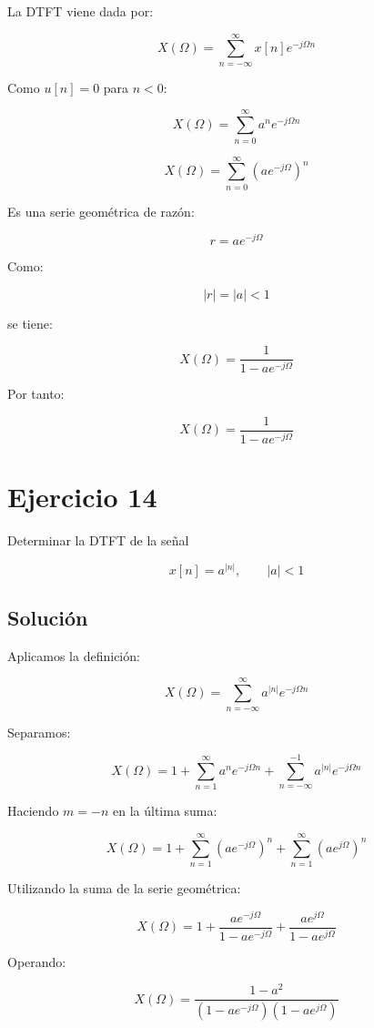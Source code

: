 \documentclass[fleqn]{article}
\begin{document}
	La DTFT viene dada por:

	\[
	X(\Omega)
	=
	\sum_{n=-\infty}^{\infty}
	x[n]e^{-j\Omega n}
	\]

	Como $u[n]=0$ para $n<0$:

	\[
	X(\Omega)
	=
	\sum_{n=0}^{\infty}
	a^ne^{-j\Omega n}
	\]

	\[
	X(\Omega)
	=
	\sum_{n=0}^{\infty}
	\left(
	ae^{-j\Omega}
	\right)^n
	\]

	Es una serie geométrica de razón:

	\[
	r=ae^{-j\Omega}
	\]

	Como:

	\[
	|r|=|a|<1
	\]

	se tiene:

	\[
	X(\Omega)
	=
	\frac{1}{1-ae^{-j\Omega}}
	\]

	Por tanto:

	\[
	\boxed{
	X(\Omega)
	=
	\frac{1}{1-ae^{-j\Omega}}
	}
	\]

\section{Ejercicio 14}
	Determinar la DTFT de la señal

	\[
	x[n]=a^{|n|},
	\qquad |a|<1
	\]

	\subsection{Solución}

	Aplicamos la definición:

	\[
	X(\Omega)
	=
	\sum_{n=-\infty}^{\infty}
	a^{|n|}e^{-j\Omega n}
	\]

	Separamos:

	\[
	X(\Omega)
	=
	1
	+
	\sum_{n=1}^{\infty}
	a^ne^{-j\Omega n}
	+
	\sum_{n=-\infty}^{-1}
	a^{|n|}e^{-j\Omega n}
	\]

	Haciendo $m=-n$ en la última suma:

	\[
	X(\Omega)
	=
	1
	+
	\sum_{n=1}^{\infty}
	\left(ae^{-j\Omega}\right)^n
	+
	\sum_{n=1}^{\infty}
	\left(ae^{j\Omega}\right)^n
	\]

	Utilizando la suma de la serie geométrica:

	\[
	X(\Omega)
	=
	1
	+
	\frac{ae^{-j\Omega}}
	{1-ae^{-j\Omega}}
	+
	\frac{ae^{j\Omega}}
	{1-ae^{j\Omega}}
	\]

	Operando:

	\[
	X(\Omega)
	=
	\frac{1-a^2}
	{
	(1-ae^{-j\Omega})(1-ae^{j\Omega})
	}
	\]
\end{document}
